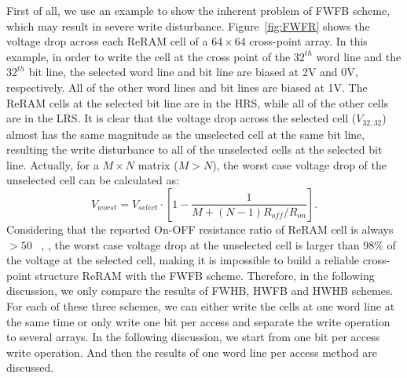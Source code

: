First of all, we use an example to show the inherent problem of FWFB scheme, which may result in severe write disturbance.
Figure~\ref{fig:FWFR} shows the voltage drop across each ReRAM cell of a $64 \times 64$ cross-point array. In this example, in order to write the cell at the cross point of the $32^{th}$ word line and the $32^{th}$ bit line, the selected word line and bit line are biased at 2V and 0V, respectively. All of the other word lines and bit lines are biased at 1V. The ReRAM cells at the selected bit line are in the HRS, while all of the other cells are in the LRS. It is clear that the voltage drop across the selected cell ($V_{32,32}$) almost has the same magnitude as the unselected cell at the same bit line, resulting the write disturbance to all of the unselected cells at the selected bit line. Actually, for a $M \times N$ matrix ($M>N$), the worst case voltage drop of the unselected cell can be calculated as:
\begin{equation}\label{worst_FWFB}
V_{worst}=V_{select} \cdot [1-\frac{1}{M+(N-1)R_{off}/R_{on}}].
\end{equation}
Considering that the reported On-OFF resistance ratio of
ReRAM cell is always $>50$ ~\cite{ReRAM_IEDM2010_Ho,ReRAM_IEDM2010_Chien,ReRAM_IEDM2010_Lee_Diode,ReRAM_IEDM2010_Lee_Evidence,ReRAM_ISSCC2011_Sheu,ReRAM_ISSCC2011_Otsuka},
, the worst case voltage drop at the unselected cell is larger than $98\%$ of the voltage at the selected cell, making it is impossible to build a reliable cross-point structure ReRAM with the FWFB scheme. Therefore, in the following discussion, we only compare the results of FWHB, HWFB and HWHB schemes. For each of these three schemes, we can either write the cells at one word line at the same time or only write one bit per access and separate the write operation to several arrays. In the
following discussion, we start from one bit per access write operation.
And then the results of one word line per access method are discussed.




